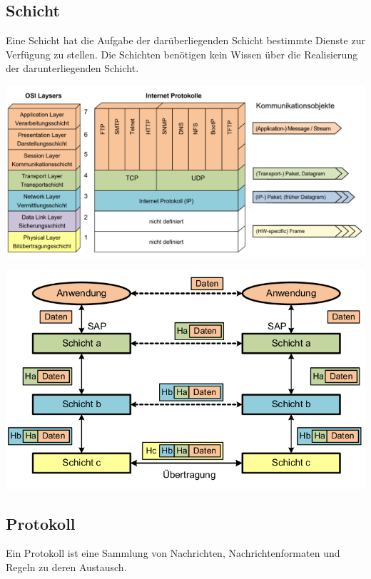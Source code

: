 \subsection{Schicht}
{Eine Schicht hat die Aufgabe der darüberliegenden Schicht bestimmte
    Dienste zur Verfügung zu stellen. Die Schichten benötigen kein Wissen über die Realisierung
    der darunterliegenden Schicht.

        {\includegraphics[scale=.4]{img/osi-1.png}}

        {\includegraphics[scale=.2]{img/osi-2.png}}}
\subsection{Protokoll}
{Ein Protokoll ist eine Sammlung von Nachrichten, Nachrichtenformaten und Regeln zu deren Austausch.
}


